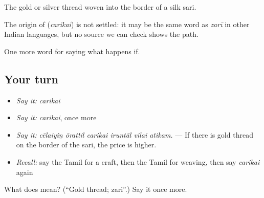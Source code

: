 The gold or silver thread woven into the border of a silk sari.

\begin{cousinweb}
The origin of \textbf{} (\emph{carikai}) is not settled: it may be the same word as \emph{zarī} in other Indian languages, but no source we can check shows the path.
\end{cousinweb}

\begin{grammarlens}[title={What you've built}]
One more word for saying what happens if.
\end{grammarlens}

\subsection*{Your turn}
\begin{itemize}
\raggedright
  \item \emph{Say it:} \emph{carikai}
  \item \emph{Say it:} \emph{carikai}, once more
  \item \emph{Say it:} \emph{cēlaiyiṉ ōrattil carikai iruntāl vilai atikam.} — If there is gold thread on the border of the sari, the price is higher.
  \item \emph{Recall:} say the Tamil for a craft, then the Tamil for weaving, then say \emph{carikai} again
\end{itemize}

\begin{tcolorbox}[breakable,colback=teal!4,colframe=teal!35!black,title={Before you move on}]
What does  mean? (\textquotedblleft{}Gold thread; zari\textquotedblright{}.) Say it once more.
\end{tcolorbox}
